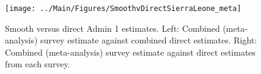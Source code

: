 \documentclass[12pt]{article}\usepackage[]{graphicx}\usepackage[]{color}
\newenvironment{knitrout}{}{} %
\begin{document}



\begin{knitrout}
\color{fgcolor}\begin{figure}[bht]

{\centering \texttt{[image: ../Main/Figures/SmoothvDirectSierraLeone\_meta]} 

}

\caption[Smooth versus direct Admin 1 estimates]{Smooth versus direct Admin 1 estimates. Left: Combined (meta-analysis) survey estimate against combined direct estimates. Right: Combined (meta-analysis) survey estimate against direct estimates from each survey.}\label{fig:unnamed-chunk-293}
\end{figure}


\end{knitrout}
\end{document}
